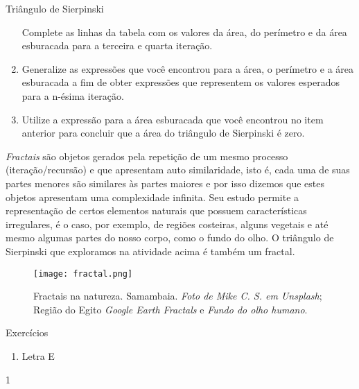 \begin{task}{Triângulo de Sierpinski}
\begin{enumerate}
Complete as linhas da tabela com os valores da área, do perímetro e da área esburacada para a terceira e quarta iteração.

\item{}
Generalize as expressões que você encontrou para a área, o perímetro e a área esburacada a fim de obter expressões que representem os valores esperados para a n-ésima iteração.

\item{}
Utilize a expressão para a área esburacada que você encontrou no item anterior para concluir que a área do triângulo de Sierpinski é zero.

\end{enumerate}

\end{task}

\begin{knowledge}

\textit{Fractais} são objetos gerados pela repetição de um mesmo processo (iteração/recursão) e que apresentam auto similaridade, isto é, cada uma de suas partes menores são similares às partes maiores e por isso dizemos que estes objetos apresentam uma complexidade infinita. Seu estudo permite a representação de certos elementos naturais que possuem características irregulares, é o caso, por exemplo, de regiões costeiras, alguns vegetais e até mesmo algumas partes do nosso corpo, como o fundo do olho. O triângulo de Sierpinski que exploramos na atividade acima é também um fractal.


\begin{figure}[H]
	\centering
	\texttt{[image: fractal.png]}
	\caption{Fractais na natureza. Samambaia.
\textit{Foto de Mike C. S. em Unsplash}; Região do Egito \textit{Google Earth Fractals} e \textit{Fundo do olho humano}.
}
\end{figure}

\end{knowledge}
\clearpage
\def\currentcolor{cor1}
\begin{answer}{Exercícios}
{\exerciselist
	\begin{enumerate}
	\item Letra E
	\end{enumerate}
}{1}
\end{answer}
